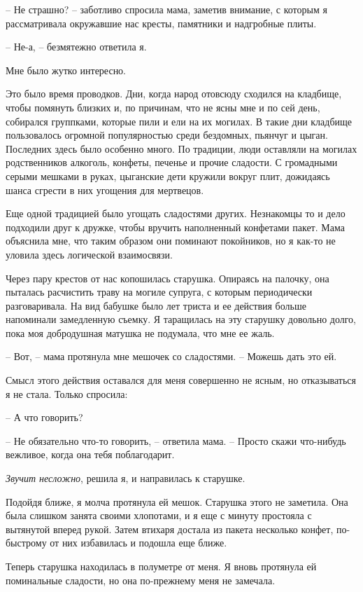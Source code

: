 \documentclass[
]{book}
\begin{document}
-- Не страшно? -- заботливо спросила мама, заметив внимание, с которым я рассматривала окружавшие нас кресты, памятники и надгробные плиты.

-- Не-а, -- безмятежно ответила я.

Мне было жутко интересно.

Это было время проводков. Дни, когда народ отовсюду сходился на кладбище, чтобы помянуть близких и, по причинам, что не ясны мне и по сей день, собирался группками, которые пили и ели на их могилах. В такие дни кладбище пользовалось огромной популярностью среди бездомных, пьянчуг и цыган. Последних здесь было особенно много. По традиции, люди оставляли на могилах родственников алкоголь, конфеты, печенье и прочие сладости. С громадными серыми мешками в руках, цыганские дети кружили вокруг плит, дожидаясь шанса сгрести в них угощения для мертвецов.

Еще одной традицией было угощать сладостями других. Незнакомцы то и дело подходили друг к дружке, чтобы вручить наполненный конфетами пакет. Мама объяснила мне, что таким образом они поминают покойников, но я как-то не уловила здесь логической взаимосвязи.

Через пару крестов от нас копошилась старушка. Опираясь на палочку, она пыталась расчистить траву на могиле супруга, с которым периодически разговаривала. На вид бабушке было лет триста и ее действия больше напоминали замедленную съемку. Я таращилась на эту старушку довольно долго, пока моя добродушная матушка не подумала, что мне ее жаль.

-- Вот, -- мама протянула мне мешочек со сладостями. -- Можешь дать это ей.

Смысл этого действия оставался для меня совершенно не ясным, но отказываться я не стала. Только спросила:

-- А что говорить?

-- Не обязательно что-то говорить, -- ответила мама. -- Просто скажи что-нибудь вежливое, когда она тебя поблагодарит.

\emph{Звучит несложно}, решила я, и направилась к старушке.

Подойдя ближе, я молча протянула ей мешок. Старушка этого не заметила. Она была слишком занята своими хлопотами, и я еще с минуту простояла с вытянутой вперед рукой. Затем втихаря достала из пакета несколько конфет, по-быстрому от них избавилась и подошла еще ближе.

Теперь старушка находилась в полуметре от меня. Я вновь протянула ей поминальные сладости, но она по-прежнему меня не замечала.
\end{document}
